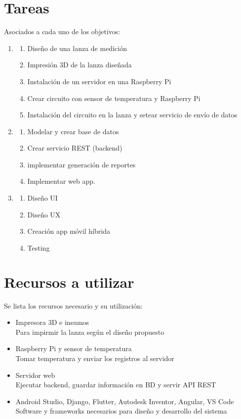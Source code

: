 \documentclass[12pt, letterpaper]{article}
\begin{document}
\section{Tareas}
Asociados a cada uno de los objetivos:
\begin{enumerate}
	\item
	\begin{enumerate}
		\item Diseño de una lanza de medición
		\item Impresión 3D de la lanza diseñada
		\item Instalación de un servidor en una Raspberry Pi
		\item Crear circuito con sensor de temperatura y Raspberry Pi
		\item Instalación del circuito en la lanza y setear servicio de envío de datos
	\end{enumerate}
	\item
	\begin{enumerate}
		\item Modelar y crear base de datos
		\item Crear servicio REST (backend)
		\item implementar generación de reportes
		\item Implementar web app.
	\end{enumerate}
	\item
	\begin{enumerate}
		\item Diseño UI
		\item Diseño UX
		\item Creación app móvil híbrida
		\item Testing
		
	\end{enumerate}
\end{enumerate}
\section{Recursos a utilizar}
Se lista los recursos necesario y su utilización:
\begin{itemize}
	\item Impresora 3D e insumos\\
	Para impirmir la lanza según el diseño propuesto
	\item Raspberry Pi y sensor de temperatura\\
	Tomar temperatura y enviar los registros al servidor
	\item Servidor web\\
	Ejecutar backend, guardar información en BD y servir API REST
	\item Android Studio, Django, Flutter, Autodesk Inventor, Angular,  VS Code\\
	Software y frameworks necesarios para diseño y desarrollo del sistema
	
\end{itemize}
\end{document}
